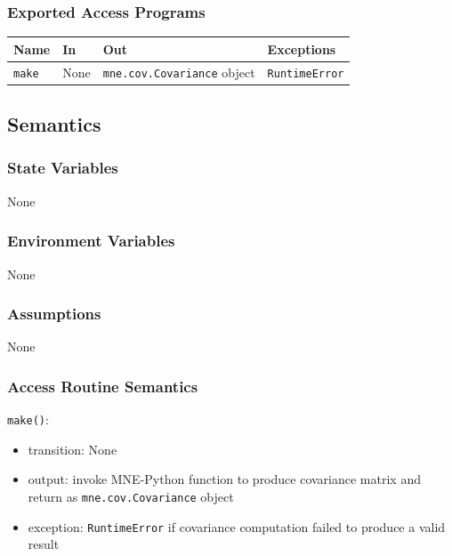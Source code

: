 \documentclass[12pt, titlepage]{article}
\begin{document}
\subsubsection{Exported Access Programs}


\begin{center}
\begin{tabular}{p{3cm} p{4cm} p{4cm} p{2cm}}
\hline
    \textbf{Name} & \textbf{In} & \textbf{Out} & \textbf{Exceptions} \\
\hline
    \lstinline|make| & None & \lstinline|mne.cov.Covariance| object & \lstinline|RuntimeError| \\
\hline
\end{tabular}
\end{center}




\subsection{Semantics}


\subsubsection{State Variables}


None




\subsubsection{Environment Variables}


None




\subsubsection{Assumptions}


None




\subsubsection{Access Routine Semantics}


\noindent \lstinline|make()|:
\begin{itemize}
    \item transition: None
    \item output: invoke MNE-Python function to produce covariance matrix and return as \lstinline|mne.cov.Covariance| object
    \item exception: \lstinline|RuntimeError| if covariance computation failed to produce a valid result
\end{itemize}
\end{document}
